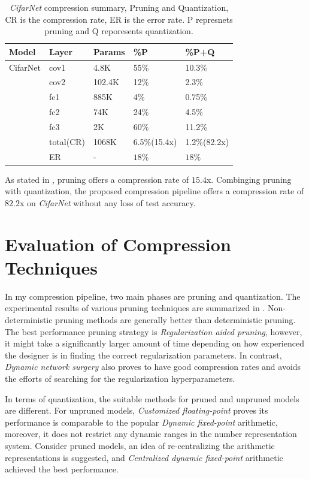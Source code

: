 \documentclass[a4paper,12pt]{report}
\begin{document}
\begin{table}[!h]
  \centering
  \begin{tabular}{lllll}
    \hline
    Model   &Layer     &Params     &\%P        &\%P+Q 	\\
    \hline
    CifarNet  &cov1     &4.8K      &55\%     &10.3\%\\
            &cov2     &102.4K    &12\%      &2.3\%\\
            &fc1      &885K      &4\%      &0.75\%\\
            &fc2      &74K       &24\%     &4.5\%\\
            &fc3      &2K        &60\%     &11.2\%\\
    \hline
            &total(CR)    &1068K     &6.5\%(15.4x) &1.2\%(82.2x)\\
    \hline
            &ER       &-         &$18\%$   &$18\%$\\
    \hline
  \end{tabular}
  \caption{\textit{CifarNet} compression summary, Pruning and Quantization, CR is the compression
  rate, ER is the error rate. P represnets pruning and Q reporesents quantization.}
  \label{tab:comp_summary2}
\end{table}
As stated in , pruning offers a compression rate
of $15.4$x. Combinging pruning with quantization, the proposed compression pipeline
offers a compression rate of $82.2$x on \textit{CifarNet} without any loss of
test accuracy.

\section{Evaluation of Compression Techniques}
In my compression pipeline, two main phases are pruning and quantization.
The experimental results of various pruning techniques are summarized in
.
Non-deterministic pruning methods are generally better than deterministic
pruning.
The best performance pruning strategy is \textit{Regularization aided pruning},
however, it might take a significantly larger amount of time depending on how
experienced the designer is in finding the correct regularization parameters.
In contrast, \textit{Dynamic network surgery} also proves to have good compression
rates and avoids the efforts of searching for the regularization hyperparameters.

In terms of quantization, the suitable methods for pruned and unpruned models
are different.
For unpruned models, \textit{Customized floating-point} proves its performance is
comparable to the popular \textit{Dynamic fixed-point} arithmetic, moreover,
it does not restrict any dynamic ranges in the number representation system.
Consider pruned models, an idea of re-centralizing the arithmetic representations
is suggested, and \textit{Centralized dynamic fixed-point} arithmetic achieved the
best performance.
\end{document}
